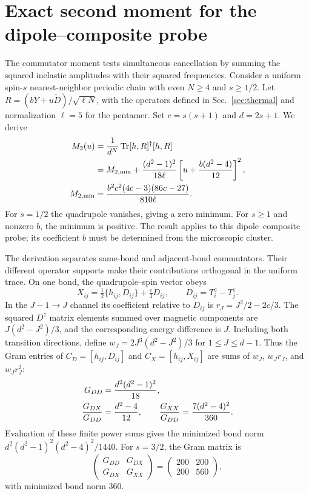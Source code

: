 \section{Exact second moment for the dipole--composite probe}
\label{app:general-moment}

The commutator moment tests simultaneous cancellation by summing the
squared inelastic amplitudes with their squared frequencies.
Consider a uniform spin-$s$ nearest-neighbor periodic chain with even
$N\ge4$ and $s\ge1/2$. Let
$R=(bY+u\widetilde D)/\sqrt{\ell N}$, with the operators defined in
Sec.~\ref{sec:thermal} and normalization $\ell=5$ for the pentamer.
Set $c=s(s+1)$ and $d=2s+1$. We derive
\begin{align}
 M_2(u)&=\frac{1}{d^N}\operatorname{Tr}[h,R]^\dagger[h,R]\notag\\
 &=M_{2,\min}+\frac{(d^2-1)^2}{18\ell}
       \left[u+\frac{b(d^2-4)}{12}\right]^2,\\
 M_{2,\min}&=\frac{b^2c^2(4c-3)(86c-27)}{810\ell}.
 \label{eq:general-moment}
\end{align}
For $s=1/2$ the quadrupole vanishes, giving a zero minimum.
For $s\ge1$ and nonzero $b$, the minimum is positive.
The result applies to this dipole--composite probe; its coefficient $b$
must be determined from the microscopic cluster.

The derivation separates same-bond and adjacent-bond commutators.
Their different operator supports make their contributions orthogonal
in the uniform trace.
On one bond, the quadrupole--spin vector obeys
\begin{equation}
 X_{ij}=\tfrac12\{h_{ij},D_{ij}\}+\tfrac{c}{3}D_{ij},
 \qquad D_{ij}=T_i^z-T_j^z.
\end{equation}
In the $J-1\to J$ channel its coefficient relative to $D_{ij}$ is
$r_J=J^2/2-2c/3$. The squared $D^z$ matrix elements summed over magnetic
components are $J(d^2-J^2)/3$, and the corresponding energy difference is
$J$. Including both transition directions, define
$w_J=2J^3(d^2-J^2)/3$ for $1\le J\le d-1$. Thus the Gram entries of
$C_D=[h_{ij},D_{ij}]$ and $C_X=[h_{ij},X_{ij}]$ are sums of
$w_J$, $w_Jr_J$, and $w_Jr_J^2$:
\begin{align}
 G_{DD}&=\frac{d^2(d^2-1)^2}{18},\notag\\
 \frac{G_{DX}}{G_{DD}}&=\frac{d^2-4}{12},\qquad
 \frac{G_{XX}}{G_{DD}}=\frac{7(d^2-4)^2}{360}.
 \label{eq:general-bond-gram}
\end{align}
Evaluation of these finite power sums gives the minimized bond norm
$d^2(d^2-1)^2(d^2-4)^2/1440$.
For $s=3/2$, the Gram matrix is
\begin{equation}
 \begin{pmatrix}G_{DD}&G_{DX}\\G_{DX}&G_{XX}\end{pmatrix}
 =\begin{pmatrix}200&200\\200&560\end{pmatrix},
 \label{eq:thermal-gram}
\end{equation}
with minimized bond norm $360$.

